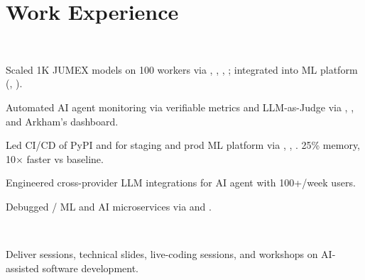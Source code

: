 \documentclass{tex/deedy-resume-openfont}
\begin{document}
\hfill
\begin{minipage}[t]{0.67\textwidth} 


\section{Work Experience}
\\
\vspace{\topsep}
\begin{tightemize}
    \item Scaled 1K JUMEX models on 100  workers via , , , ; integrated into ML platform (, ).
    \item Automated AI agent monitoring via verifiable metrics and LLM-as-Judge via , ,  and Arkham's dashboard.
    \item Led CI/CD of PyPI and  for staging and prod ML platform via , , . 25\% memory, 10$\times$ faster vs baseline.
    \item Engineered cross-provider LLM integrations for AI agent with 100+/week users.
    \item Debugged / ML and AI microservices via  and .
\end{tightemize}
\sectionsep

\\
\begin{tightemize}
    \item Deliver sessions, technical slides, live-coding sessions, and workshops on AI-assisted software development.
\end{tightemize}
\sectionsep


\end{minipage}
\end{document}
